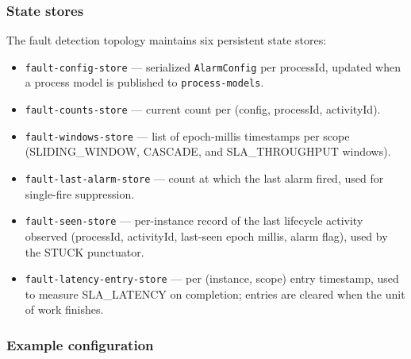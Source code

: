 \subsubsection{State stores}

The fault detection topology maintains six persistent state stores:

\begin{itemize}
\item \texttt{fault-config-store} --- serialized \texttt{AlarmConfig} per
  processId, updated when a process model is published to
  \texttt{process-models}.
\item \texttt{fault-counts-store} --- current count per (config, processId, activityId).
\item \texttt{fault-windows-store} --- list of epoch-millis timestamps per scope
  (SLIDING\_WINDOW, CASCADE, and SLA\_THROUGHPUT windows).
\item \texttt{fault-last-alarm-store} --- count at which the last alarm fired,
  used for single-fire suppression.
\item \texttt{fault-seen-store} --- per-instance record of the last lifecycle
  activity observed (processId, activityId, last-seen epoch millis, alarm
  flag), used by the STUCK punctuator.
\item \texttt{fault-latency-entry-store} --- per (instance, scope) entry
  timestamp, used to measure SLA\_LATENCY on completion; entries are cleared
  when the unit of work finishes.
\end{itemize}

\subsubsection{Example configuration}

